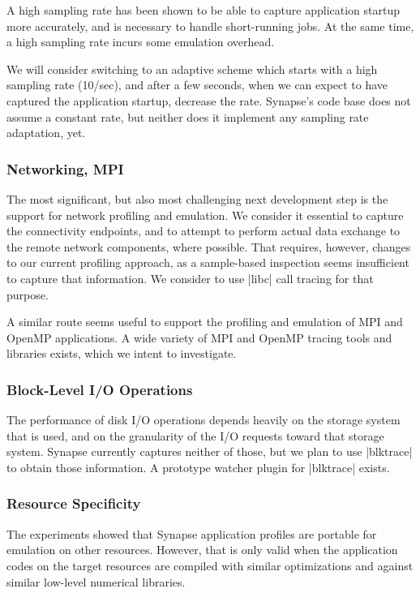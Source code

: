 \documentclass[10pt, conference, compsocconf]{IEEEtran}
\newcommand{\synapse}{Synapse\xspace}
\begin{document}
 A high sampling rate has been shown to be able to capture application startup
 more accurately, and is necessary to handle short-running jobs.  At the same
 time, a high sampling rate incurs some emulation overhead.

 We will consider switching to an adaptive scheme which starts with a high
 sampling rate (10/sec), and after a few seconds, when we can expect to have
 captured the application startup, decrease the rate.  \synapse's code base does
 not assume a constant rate, but neither does it implement any sampling rate
 adaptation, yet.

 \subsubsection*{Networking, MPI}

 The most significant, but also most challenging next development step
 is the support for network profiling and emulation.  We consider it
 essential to capture the connectivity endpoints, and to attempt to
 perform actual data exchange to the remote network components, where
 possible.  That requires, however, changes to our current profiling
 approach, as a sample-based inspection seems insufficient to capture
 that information.  We consider to use |libc| call tracing for that
 purpose.

 A similar route seems useful to support the profiling and emulation
 of MPI and OpenMP applications.  A wide variety of MPI and OpenMP
 tracing tools and libraries exists, which we intent to investigate.


 \subsubsection*{Block-Level I/O Operations}

 The performance of disk I/O operations depends heavily on the
 storage system that is used, and on the granularity of the I/O requests toward
 that storage system.  \synapse currently captures neither of those,
 but we plan to use |blktrace| to obtain those information.  A
 prototype watcher plugin for |blktrace| exists.


 \subsubsection*{Resource Specificity}

 The experiments showed that \synapse application profiles are portable
 for emulation on other resources.  However, that is only valid when
 the application codes on the target resources are compiled with
 similar optimizations and against similar low-level numerical
 libraries.  
 
\end{document}
